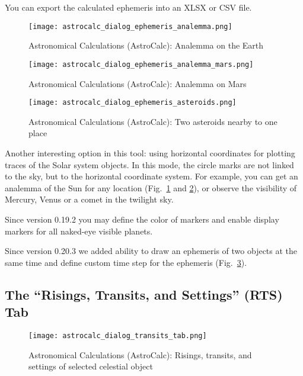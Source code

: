 You can export the calculated ephemeris into an XLSX or CSV file. 

\begin{figure}[tbp]
	\centering\texttt{[image: astrocalc\_dialog\_ephemeris\_analemma.png]}
	\caption{Astronomical Calculations (AstroCalc): Analemma on the Earth}
	\label{fig:gui:AstroCalc:Ephemeris:Analemma}
\end{figure}

\begin{figure}[p]
	\centering\texttt{[image: astrocalc\_dialog\_ephemeris\_analemma\_mars.png]}
	\caption{Astronomical Calculations (AstroCalc): Analemma on Mars}
	\label{fig:gui:AstroCalc:Ephemeris:AnalemmaMars}
\end{figure}

\begin{figure}[p]
	\centering\texttt{[image: astrocalc\_dialog\_ephemeris\_asteroids.png]}
	\caption{Astronomical Calculations (AstroCalc): Two asteroids nearby to one place}
	\label{fig:gui:AstroCalc:Ephemeris:Asteroids}
\end{figure}

Another interesting option in this tool: using horizontal coordinates for plotting traces of the Solar system objects. 
In this mode, the circle marks are not linked to the sky, but to the horizontal coordinate system.
For example, you can get an analemma of the Sun for any location (Fig.~\ref{fig:gui:AstroCalc:Ephemeris:Analemma}
and \ref{fig:gui:AstroCalc:Ephemeris:AnalemmaMars}), 
or observe the visibility of Mercury, Venus or a comet in the twilight sky.

Since version 0.19.2 you may define the color of markers and 
enable display markers for all naked-eye visible planets.

Since version 0.20.3 we added ability to draw an ephemeris of 
two objects at the same time and define custom time step for the ephemeris 
(Fig.~\ref{fig:gui:AstroCalc:Ephemeris:Asteroids}).

\subsection{The ``Risings, Transits, and Settings'' (RTS) Tab}
\label{sec:gui:AstroCalc:RTS}

\begin{figure}[htbp]
	\centering\texttt{[image: astrocalc\_dialog\_transits\_tab.png]}
	\caption{Astronomical Calculations (AstroCalc): Risings, transits, and settings of selected celestial object}
	\label{fig:gui:AstroCalc:RTS}
\end{figure}

